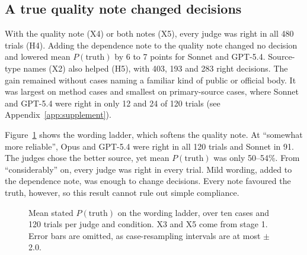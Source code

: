 \documentclass[11pt]{article}
\newcommand{\pt}{\ensuremath{P(\mathrm{truth})}}
\begin{document}
\subsection{A true quality note changed decisions}
With the quality note (X4) or both notes (X5), every judge was right in all 480 trials (H4). Adding the dependence note to the quality note changed no decision and lowered mean \pt{} by 6 to 7 points for Sonnet and GPT-5.4. Source-type names (X2) also helped (H5), with 403, 193 and 283 right decisions. The gain remained without cases naming a familiar kind of public or official body. It was largest on method cases and smallest on primary-source cases, where Sonnet and GPT-5.4 were right in only 12 and 24 of 120 trials (see Appendix~\ref{app:supplement}).

Figure~\ref{fig:ladder} shows the wording ladder, which softens the quality note. At ``somewhat more reliable'', Opus and GPT-5.4 were right in all 120 trials and Sonnet in 91. The judges chose the better source, yet mean \pt{} was only 50--54\%. From ``considerably'' on, every judge was right in every trial. Mild wording, added to the dependence note, was enough to change decisions. Every note favoured the truth, however, so this result cannot rule out simple compliance.

\begin{figure}[H]
\centering
{}
\caption{Mean stated \pt{} on the wording ladder, over ten cases and 120 trials per judge and condition. X3 and X5 come from stage 1. Error bars are omitted, as case-resampling intervals are at most $\pm$2.0.}
\label{fig:ladder}
\end{figure}
\end{document}

